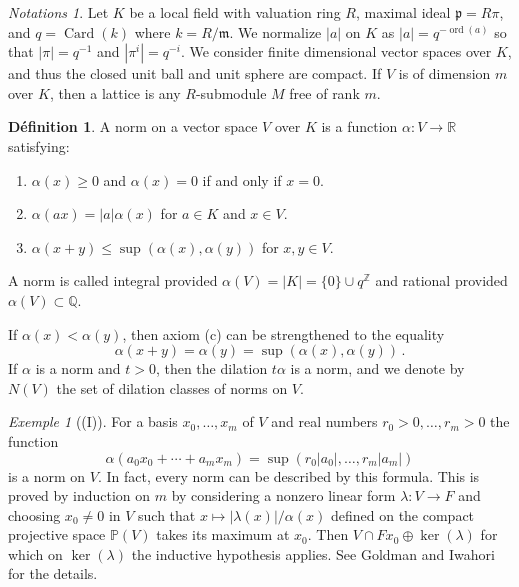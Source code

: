 \documentclass[12pt,a4paper]{article}
\theoremstyle{plain}
\theoremstyle{definition}
\newtheorem{definition}{D\'efinition}[section]
\theoremstyle{remark}
\newtheorem{example}{Exemple}[section]
\newtheorem{notations}{Notations}[section]
\DeclareMathOperator{\Card}{Card}
\DeclareMathOperator{\ord}{ord}
\begin{document}
\begin{notations}
Let $K$ be a local field with valuation ring $R$, maximal ideal 
$\mathfrak{p} = R\pi$, and $q = \Card(k)$ where $k = R/\mathfrak{m}$. We 
normalize $|a|$ on $K$ as $|a| = q^{-\ord(a)}$ so that $|\pi| = q^{-1}$ and 
$|\pi^i| = q^{-i}$. We consider finite dimensional vector spaces over $K$, 
and thus the closed unit ball and unit sphere are compact. If $V$ is of 
dimension $m$ over $K$, then a lattice is any $R$-submodule $M$ free of rank 
$m$.
\end{notations}

\begin{definition}
A norm on a vector space $V$ over $K$ is a function $\alpha\colon V \to \mathbb{R}$ 
satisfying:
\begin{enumerate}[label=(\alph*)]
\item $\alpha(x) \geqslant 0$ and $\alpha(x) = 0$ if and only if $x = 0$.
\item $\alpha(ax) = |a|\alpha(x)$ for $a \in K$ and $x \in V$.
\item $\alpha(x+y) \leqslant \sup(\alpha(x), \alpha(y))$ for $x, y \in V$.
\end{enumerate}
A norm is called integral provided $\alpha(V) = |K| = \{0\} \cup q^\mathbb{Z}$ 
and rational provided $\alpha(V) \subset \mathbb{Q}$.
\end{definition}

If $\alpha(x) < \alpha(y)$, then axiom (c) can be strengthened to the equality
\[
\alpha(x+y) = \alpha(y) = \sup(\alpha(x), \alpha(y)) \,.
\]
If $\alpha$ is a norm and $t > 0$, then the dilation $t\alpha$ is a norm, and 
we denote by $N(V)$ the set of dilation classes of norms on $V$.

\begin{example}[(I)]
For a basis $x_0, \ldots, x_m$ of $V$ and real numbers $r_0 > 0, \ldots, r_m > 0$ 
the function
\[
\alpha(a_0 x_0 + \cdots + a_m x_m) = \sup(r_0|a_0|, \ldots, r_m|a_m|)
\]
is a norm on $V$. In fact, every norm can be described by this formula. This 
is proved by induction on $m$ by considering a nonzero linear form 
$\lambda\colon V \to F$ and choosing $x_0 \neq 0$ in $V$ such that 
$x \mapsto |\lambda(x)|/\alpha(x)$ defined on the compact projective space 
$\mathbb{P}(V)$ takes its maximum at $x_0$. Then $V \cap Fx_0 \oplus \ker(\lambda)$ 
for which on $\ker(\lambda)$ the inductive hypothesis applies. See Goldman and 
Iwahori for the details.
\end{example}
\end{document}
